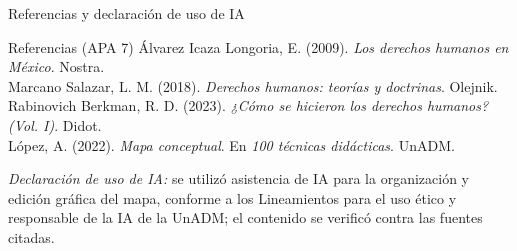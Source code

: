 \documentclass[
  spanish,
  aspectratio=169,
  xcolor={dvipsnames,table}
]{beamer}
\begin{document}
\begin{frame}{Referencias y declaración de uso de IA}
  \begin{block}{Referencias (APA 7)}
    \footnotesize
    Álvarez Icaza Longoria, E. (2009). \textit{Los derechos humanos en México}. Nostra.\\
    Marcano Salazar, L. M. (2018). \textit{Derechos humanos: teorías y doctrinas}. Olejnik.\\
    Rabinovich Berkman, R. D. (2023). \textit{¿Cómo se hicieron los derechos humanos? (Vol. I)}. Didot.\\
    López, A. (2022). \textit{Mapa conceptual}. En \textit{100 técnicas didácticas}. UnADM.
  \end{block}
  {\footnotesize \textit{Declaración de uso de IA:} se utilizó asistencia de IA para la organización y edición gráfica del mapa, conforme a los Lineamientos para el uso ético y responsable de la IA de la UnADM; el contenido se verificó contra las fuentes citadas.}
\end{frame}
\end{document}
